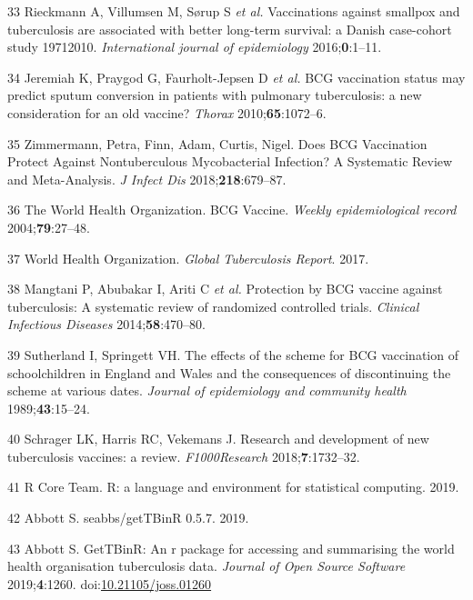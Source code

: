 \documentclass[11pt,twoside]{bristolthesis}
\begin{document}
  \leavevmode\hypertarget{ref-Rieckmann2016}{}%
  33 Rieckmann A, Villumsen M, Sørup S \emph{et al.} Vaccinations against smallpox and tuberculosis are associated with better long-term survival: a Danish case-cohort study 19712010. \emph{International journal of epidemiology} 2016;\textbf{0}:1--11.
  
  \leavevmode\hypertarget{ref-Jeremiah2010}{}%
  34 Jeremiah K, Praygod G, Faurholt-Jepsen D \emph{et al.} BCG vaccination status may predict sputum conversion in patients with pulmonary tuberculosis: a new consideration for an old vaccine? \emph{Thorax} 2010;\textbf{65}:1072--6.
  
  \leavevmode\hypertarget{ref-Zimmermann:2018io}{}%
  35 Zimmermann, Petra, Finn, Adam, Curtis, Nigel. Does BCG Vaccination Protect Against Nontuberculous Mycobacterial Infection? A Systematic Review and Meta-Analysis. \emph{J Infect Dis} 2018;\textbf{218}:679--87.
  
  \leavevmode\hypertarget{ref-The2004}{}%
  36 The World Health Organization. BCG Vaccine. \emph{Weekly epidemiological record} 2004;\textbf{79}:27--48.
  
  \leavevmode\hypertarget{ref-WHO2017}{}%
  37 World Health Organization. \emph{Global Tuberculosis Report}. 2017.
  
  \leavevmode\hypertarget{ref-Mangtani2014}{}%
  38 Mangtani P, Abubakar I, Ariti C \emph{et al.} Protection by BCG vaccine against tuberculosis: A systematic review of randomized controlled trials. \emph{Clinical Infectious Diseases} 2014;\textbf{58}:470--80.
  
  \leavevmode\hypertarget{ref-Sutherland1989}{}%
  39 Sutherland I, Springett VH. The effects of the scheme for BCG vaccination of schoolchildren in England and Wales and the consequences of discontinuing the scheme at various dates. \emph{Journal of epidemiology and community health} 1989;\textbf{43}:15--24.
  
  \leavevmode\hypertarget{ref-Schrager:2018ip}{}%
  40 Schrager LK, Harris RC, Vekemans J. Research and development of new tuberculosis vaccines: a review. \emph{F1000Research} 2018;\textbf{7}:1732--32.
  
  \leavevmode\hypertarget{ref-RCoreTeam2019}{}%
  41 R Core Team. R: a language and environment for statistical computing. 2019.
  
  \leavevmode\hypertarget{ref-Abbott:2019}{}%
  42 Abbott S. seabbs/getTBinR 0.5.7. 2019.
  
  \leavevmode\hypertarget{ref-Abbott:2018}{}%
  43 Abbott S. GetTBinR: An r package for accessing and summarising the world health organisation tuberculosis data. \emph{Journal of Open Source Software} 2019;\textbf{4}:1260. doi:\href{https://doi.org/10.21105/joss.01260}{10.21105/joss.01260}
  
\end{document}
